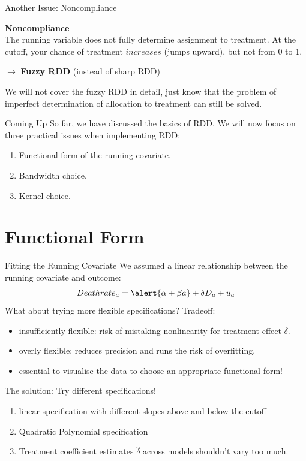 \documentclass[9pt,aspectratio=169, xcolor=dvipsnames]{beamer}
\begin{document}
			
\begin{frame}{Another Issue: Noncompliance}
				
				\textbf{Noncompliance} \\
				The running variable does not fully determine assignment to treatment. At the cutoff, your chance of treatment $increases$ (jumps upward), but not from 0 to 1.
				
				$\rightarrow$ \textbf{Fuzzy RDD} (instead of sharp RDD)
				
				We will not cover the fuzzy RDD in detail, just know that the problem of imperfect determination of allocation to treatment can still be solved.
\end{frame}

\begin{frame}{Coming Up}
				So far, we have discussed the basics of RDD. We will now focus on three practical issues when implementing RDD:
				\begin{enumerate}
					\item Functional form of the running covariate.
					\item Bandwidth choice.
					\item Kernel choice.
				\end{enumerate}
\end{frame}

\section{Functional Form}

\begin{frame}{Fitting the Running Covariate}
\linespread{1.3}\selectfont %
	We assumed a \alert{linear} relationship between the running covariate and outcome:
	\begin{align*}
			Deathrate_a = \alert{\alpha + \beta a} + \delta  D_a + u_a 
	\end{align*}
	\pause
	What about trying more flexible specifications? Tradeoff:
		\begin{itemize}
				\item insufficiently flexible: risk of mistaking nonlinearity for treatment effect $\delta$.
				\item overly flexible: reduces precision and runs the risk of overfitting.			
			\pause
				\item essential to visualise the data to choose an appropriate functional form!
		\end{itemize}
	\pause
	The solution: Try different specifications! 
		\begin{enumerate}
			\item linear specification with different slopes above and below the cutoff
			\item Quadratic Polynomial specification
			\item[$\rightarrow$] Treatment coefficient estimates $\hat{\delta}$ across models shouldn't vary too much.
		\end{enumerate}
	\end{frame}
	
\end{document}
